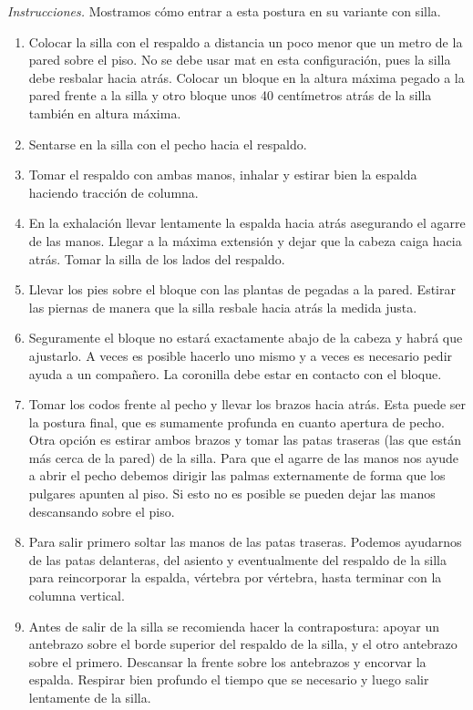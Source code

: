 \emph{Instrucciones.} Mostramos cómo entrar a
esta postura en su variante con silla.
\begin{enumerate}
\item Colocar la silla con el respaldo a
distancia un poco menor que un metro de la
pared sobre el piso. No se debe usar mat en
esta configuración, pues la silla debe
resbalar hacia atrás. Colocar un bloque en la
altura máxima pegado a la pared frente a la
silla y otro bloque unos 40 centímetros atrás
de la silla también en altura máxima.
\item Sentarse en la silla con el pecho hacia
el respaldo.
\item Tomar el respaldo con ambas manos,
inhalar y estirar bien la espalda haciendo
tracción de columna.
\item En la exhalación llevar lentamente la
espalda hacia atrás asegurando el agarre de
las manos. Llegar a la máxima extensión y
dejar que la cabeza caiga hacia atrás. Tomar
la silla de los lados del respaldo.
\item Llevar los pies sobre el bloque con las
plantas de pegadas a la pared. Estirar las
piernas de manera que la silla resbale hacia
atrás la medida justa.
\item Seguramente el bloque no estará
exactamente abajo de la cabeza y habrá que
ajustarlo. A veces es posible hacerlo uno
mismo y a veces es necesario pedir ayuda a un
compañero. La coronilla debe estar en
contacto con el bloque.
\item Tomar los codos frente al pecho y
llevar los brazos hacia atrás. Esta puede ser
la postura final, que es sumamente profunda
en cuanto apertura de pecho. Otra opción es
estirar ambos brazos y tomar las patas
traseras (las que están más cerca de la
pared) de la silla. Para que el agarre de las
manos nos ayude a abrir el pecho debemos
dirigir las palmas externamente de forma que
los pulgares apunten al piso. Si esto no es
posible se pueden dejar las manos descansando
sobre el piso.
\item Para salir primero soltar las manos de
las patas traseras. Podemos ayudarnos de las
patas delanteras, del asiento y eventualmente
del respaldo de la silla para reincorporar la
espalda, vértebra por vértebra, hasta
terminar con la columna vertical.
\item Antes de salir de la silla se
recomienda hacer la contrapostura: apoyar un
antebrazo sobre el borde superior del
respaldo de la silla, y el otro antebrazo
sobre el primero. Descansar la frente sobre
los antebrazos y encorvar la espalda.
Respirar bien profundo el tiempo que se
necesario y luego salir lentamente de la
silla.
\end{enumerate}

